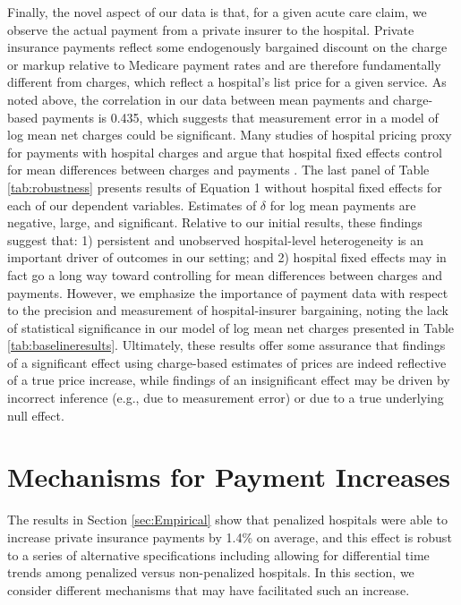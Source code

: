 \documentclass[12pt]{article}
\begin{document}
Finally, the novel aspect of our data is that, for a given acute care claim, we observe the actual payment from a private insurer to the hospital. Private insurance payments reflect some endogenously bargained discount on the charge or markup relative to Medicare payment rates and are therefore fundamentally different from charges, which reflect a hospital's list price for a given service. As noted above, the correlation in our data between mean payments and charge-based payments is 0.435, which suggests that measurement error in a model of log mean net charges could be significant. Many studies of hospital pricing proxy for payments with hospital charges and argue that hospital fixed effects control for mean differences between charges and payments \citep{cutler2000}. The last panel of Table \ref{tab:robustness} presents results of Equation 1 without hospital fixed effects for each of our dependent variables.  Estimates of $\delta$ for log mean payments are negative, large, and significant. Relative to our initial results, these findings suggest that: 1) persistent and unobserved hospital-level heterogeneity is an important driver of outcomes in our setting; and 2) hospital fixed effects may in fact go a long way toward controlling for mean differences between charges and payments. However, we emphasize the importance of payment data with respect to the precision and measurement of hospital-insurer bargaining, noting the lack of statistical significance in our model of log mean net charges presented in Table \ref{tab:baselineresults}. Ultimately, these results offer some assurance that findings of a significant effect using charge-based estimates of prices are indeed reflective of a true price increase, while findings of an insignificant effect may be driven by incorrect inference (e.g., due to measurement error) or due to a true underlying null effect.

\section{Mechanisms for Payment Increases}
\label{sec:alt}
The results in Section \ref{sec:Empirical} show that penalized hospitals were able to increase private insurance payments by 1.4\% on average, and this effect is robust to a series of alternative specifications including allowing for differential time trends among penalized versus non-penalized hospitals. In this section, we consider different mechanisms that may have facilitated such an increase.
\end{document}
